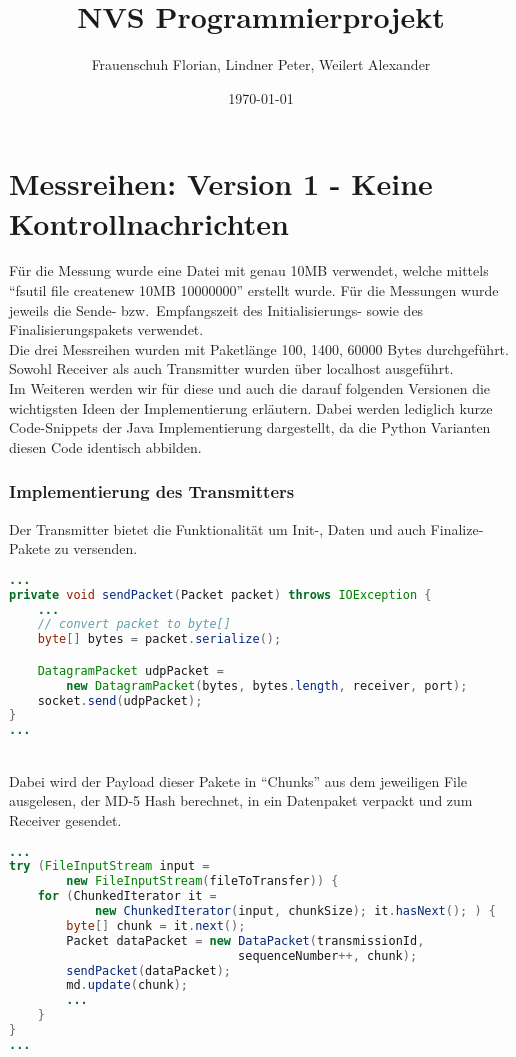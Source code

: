 \documentclass{article}
\title{NVS Programmierprojekt}
\author{Frauenschuh Florian, Lindner Peter, Weilert Alexander}
\date{\today}
\begin{document}
    \maketitle

    \section{Messreihen: Version 1 - Keine Kontrollnachrichten}
    Für die Messung wurde eine Datei mit genau 10MB verwendet, welche mittels \enquote{fsutil file createnew 10MB 10000000} erstellt wurde.
    Für die Messungen wurde jeweils die Sende- bzw.\ Empfangszeit des Initialisierungs- sowie des Finalisierungspakets verwendet. \\
    Die drei Messreihen wurden mit Paketlänge 100, 1400, 60000 Bytes durchgeführt. \\
    Sowohl Receiver als auch Transmitter wurden über localhost ausgeführt.\\
    Im Weiteren werden wir für diese und auch die darauf folgenden Versionen die wichtigsten Ideen der Implementierung
    erläutern.
    Dabei werden lediglich kurze Code-Snippets der Java Implementierung dargestellt, da die Python Varianten diesen
    Code identisch abbilden.

    \subsubsection*{Implementierung des Transmitters}
    Der Transmitter bietet die Funktionalität um Init-, Daten und auch Finalize-Pakete zu versenden.
    \begin{lstlisting}[language=Java]
...
private void sendPacket(Packet packet) throws IOException {
    ...
    // convert packet to byte[]
    byte[] bytes = packet.serialize();

    DatagramPacket udpPacket =
        new DatagramPacket(bytes, bytes.length, receiver, port);
    socket.send(udpPacket);
}
...
    \end{lstlisting} \\
    Dabei wird der Payload dieser Pakete in \enquote{Chunks} aus dem jeweiligen File ausgelesen, der MD-5 Hash berechnet,
    in ein Datenpaket verpackt und zum Receiver gesendet. \\
    \begin{lstlisting}[language=Java]
...
try (FileInputStream input =
        new FileInputStream(fileToTransfer)) {
    for (ChunkedIterator it =
            new ChunkedIterator(input, chunkSize); it.hasNext(); ) {
        byte[] chunk = it.next();
        Packet dataPacket = new DataPacket(transmissionId,
                                sequenceNumber++, chunk);
        sendPacket(dataPacket);
        md.update(chunk);
        ...
    }
}
...
    \end{lstlisting}
\end{document}
